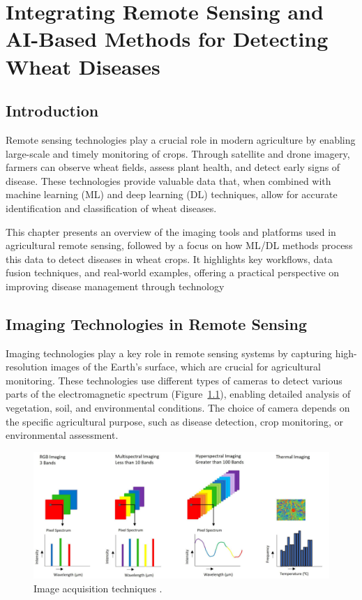 \chapter{Integrating Remote Sensing and AI-Based Methods for Detecting Wheat Diseases}

\section{Introduction}
Remote sensing technologies play a crucial role in modern agriculture by enabling large-scale and timely monitoring of crops. Through satellite and drone imagery, farmers can observe wheat fields, assess plant health, and detect early signs of disease. These technologies provide valuable data that, when combined with machine learning (ML) and deep learning (DL) techniques, allow for accurate identification and classification of wheat diseases.

This chapter presents an overview of the imaging tools and platforms used in agricultural remote sensing, followed by a focus on how ML/DL methods process this data to detect diseases in wheat crops. It highlights key workflows, data fusion techniques, and real-world examples, offering a practical perspective on improving disease management through technology

\section{Imaging Technologies in Remote Sensing}
Imaging technologies play a key role in remote sensing systems by capturing high-resolution images of the Earth’s surface, which are crucial for agricultural monitoring. These technologies use different types of cameras to detect various parts of the electromagnetic spectrum (Figure~\ref{fig:ImageAcquisition}), enabling detailed analysis of vegetation, soil, and environmental conditions. The choice of camera depends on the specific agricultural purpose, such as disease detection, crop monitoring, or environmental assessment.

\begin{figure}[H]
    \centering
    \includegraphics[width=0.8
    \textwidth]{chapters/chapter3/images/Figure01.png}
    \caption{Image acquisition techniques \protect\parencite{ghazal2024computer}.}
    \label{fig:ImageAcquisition}
\end{figure}




